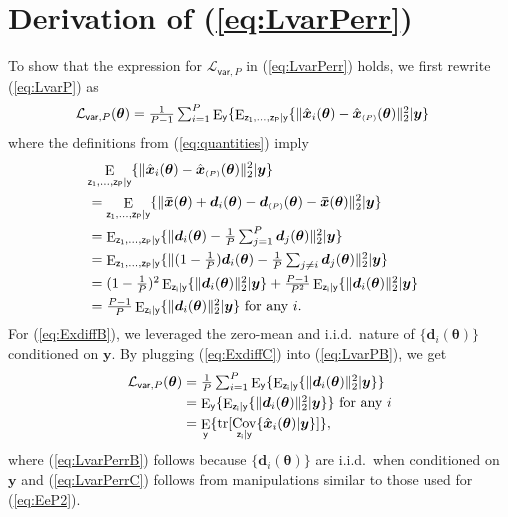 \documentclass{article}
\theoremstyle{plain}
\theoremstyle{definition}
\theoremstyle{remark}
\newcommand{\ovec}[1]{\boldsymbol{\Bar{#1}}}
\newcommand{\hvec}[1]{\ensuremath{\Hat{\boldsymbol{#1}}}}
\renewcommand{\vec}[1]{\ensuremath{\boldsymbol{#1}}}
\newcommand{\mc}[1]{\ensuremath{\mathcal{#1}}}
\DeclareMathOperator{\E}{E}
\DeclareMathOperator{\Cov}{Cov}
\DeclareMathOperator{\tr}{tr}
\renewcommand{\eqref}[1]{(\ref{eq:#1})}
\newcommand{\Ey}{\E_{\mathsf{y}}}
\newcommand{\Ezigy}{\E_{\mathsf{z_i}|\mathsf{y}}}
\newcommand{\EzPgy}{\E_{\mathsf{z_1,...,z_P}|\mathsf{y}}}
\newcommand{\Covzigy}{\Cov_{\mathsf{z_i}|\mathsf{y}}}
\newcommand{\LvarP}{\mc{L}_{\mathsf{var},P}}
\newcommand{\avgP}{_{\scriptscriptstyle (P)}}
\begin{document}
\section{Derivation of \eqref{LvarPerr}} \label{app:LvarPerr}

To show that the expression for $\LvarP$ in \eqref{LvarPerr} holds, we first rewrite \eqref{LvarP} as
\begin{align}
\LvarP(\vec{\theta})
&= \textstyle \frac{1}{P-1}\sum_{i=1}^P \Ey\{ \EzPgy\{\|\hvec{x}_i(\vec{\theta})-\hvec{x}\avgP(\vec{\theta})\|_2^2 | \vec{y}\} 
\label{eq:LvarPB}
\end{align}
where the definitions from \eqref{quantities} imply
\begin{align}
\lefteqn{
\EzPgy\{\|\hvec{x}_i(\vec{\theta})-\hvec{x}\avgP(\vec{\theta})\|_2^2 | \vec{y}\}
}\nonumber\\
&= \EzPgy\{\|\ovec{x}(\vec{\theta}) + \vec{d}_i(\vec{\theta}) - \vec{d}\avgP(\vec{\theta}) - \ovec{x}(\vec{\theta})\|_2^2 | \vec{y}\} \\
&= \textstyle \EzPgy\{\|\vec{d}_i(\vec{\theta}) - \frac{1}{P}\sum_{j=1}^P\vec{d}_j(\vec{\theta})\|_2^2 | \vec{y}\} \\
&= \textstyle \EzPgy\{\|(1-\frac{1}{P})\vec{d}_i(\vec{\theta}) - \frac{1}{P}\sum_{j\neq i}\vec{d}_j(\vec{\theta})\|_2^2 | \vec{y}\} \\
&= \textstyle (1-\frac{1}{P})^2 \Ezigy\{\|\vec{d}_i(\vec{\theta})\|_2^2 | \vec{y}\} 
        + \frac{P-1}{P^2}\Ezigy\{\|\vec{d}_i(\vec{\theta})\|_2^2 | \vec{y}\} 
\label{eq:ExdiffB}\\
&= \textstyle \frac{P-1}{P} \Ezigy\{\|\vec{d}_i(\vec{\theta})\|_2^2 | \vec{y}\} \text{~for any $i$} 
\label{eq:ExdiffC}.
\end{align}
For \eqref{ExdiffB}, we leveraged the zero-mean and i.i.d.\ nature of $\{\vec{d}_i(\vec{\theta})\}$ conditioned on $\vec{y}$.
By plugging \eqref{ExdiffC} into \eqref{LvarPB}, we get
\begin{align}
\LvarP(\vec{\theta})
&= \textstyle \frac{1}{P}\sum_{i=1}^P \Ey\{ \Ezigy\{\|\vec{d}_i(\vec{\theta})\|_2^2 | \vec{y}\} \}\\
&= \textstyle \Ey\{ \Ezigy\{\|\vec{d}_i(\vec{\theta})\|_2^2 | \vec{y}\} \} 
\text{~for any $i$}
\label{eq:LvarPerrB} \\
&= \Ey\{ \tr [ \Covzigy\{\hvec{x}_i(\vec{\theta}) | \vec{y}\} ] \}
\label{eq:LvarPerrC} ,
\end{align}
where \eqref{LvarPerrB} follows because $\{\vec{d}_i(\vec{\theta})\}$ are i.i.d.\ when conditioned on $\vec{y}$
and \eqref{LvarPerrC} follows from manipulations similar to those used for \eqref{EeP2}. 
\end{document}
